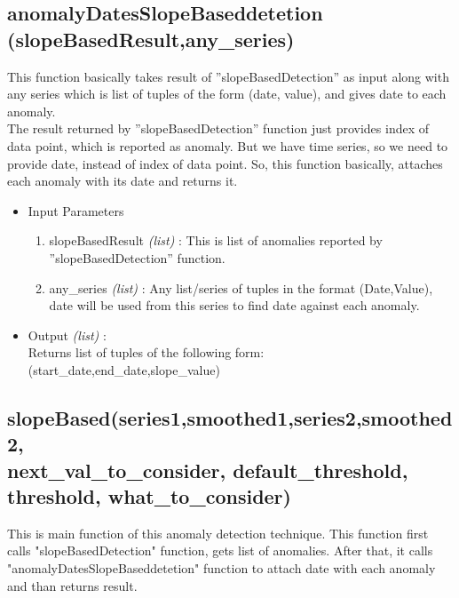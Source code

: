 \subsection{anomalyDatesSlopeBaseddetetion\\(slopeBasedResult,any\_series)}

This function basically takes result of ”slopeBasedDetection” as input along with
any series which is list of tuples of the form (date, value), and gives date to each
anomaly.\\

The result returned by ”slopeBasedDetection” function just provides index of
data point, which is reported as anomaly. But we have time series, so we need
to provide date, instead of index of data point. So, this function basically,
attaches each anomaly with its date and returns it.\\

\begin{itemize}
 \item Input Parameters
 
 \begin{enumerate}
  \item slopeBasedResult \textit{(list)} : This is list of anomalies reported by ”slopeBasedDetection” function.
  \item any\_series \textit{(list)} : Any list/series of tuples in the format (Date,Value), date will be used from this series to find date against each anomaly.
 \end{enumerate}

 \item Output \textit{(list)} : \\
 	Returns list of tuples of the following form: \\ 
 	(start\_date,end\_date,slope\_value)

\end{itemize}


\subsection{slopeBased(series1,smoothed1,series2,smoothed2,\\next\_val\_to\_consider, default\_threshold, \\threshold, what\_to\_consider)}

This is main function of this anomaly detection technique. This function first calls "slopeBasedDetection" function, gets list of anomalies. 
After that, it calls "anomalyDatesSlopeBaseddetetion" function to attach date with each anomaly and than returns result.

